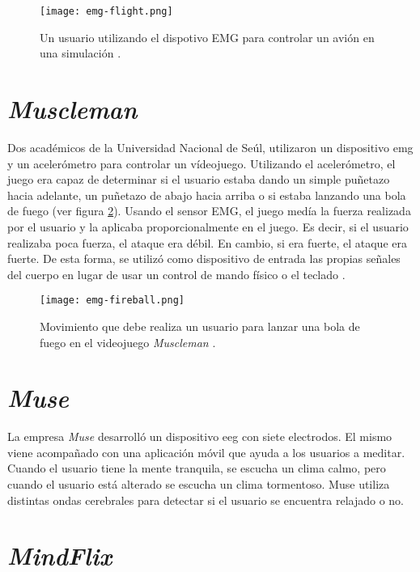 \begin{figure}[H]
	\centering
    \texttt{[image: emg-flight.png]}
    \caption{Un usuario utilizando el dispotivo EMG para controlar un avión en una simulación  \cite{emg-flight}.}
	\label{fig:emg-flight}
\end{figure}

\section{\emph{Muscleman}}

Dos académicos de la Universidad Nacional de Seúl, utilizaron un dispositivo \acrshort{emg} y un acelerómetro para controlar un vídeojuego. Utilizando el acelerómetro, el juego era capaz de determinar si el usuario estaba dando un simple puñetazo hacia adelante, un puñetazo de abajo hacia arriba o si estaba lanzando una bola de fuego (ver figura \ref{fig:fireball}). Usando el sensor EMG, el juego medía la fuerza realizada por el usuario y la aplicaba proporcionalmente en el juego. Es decir, si el usuario realizaba poca fuerza, el ataque era débil. En cambio, si era fuerte, el ataque era fuerte. De esta forma, se utilizó como dispositivo de entrada las propias señales del cuerpo en lugar de usar un control de mando físico o el teclado \cite{emg-fireball}.

\begin{figure}[H]
    \texttt{[image: emg-fireball.png]}
    \caption{Movimiento que debe realiza un usuario para lanzar una bola de fuego en el videojuego \emph{Muscleman} \cite{emg-fireball}.}
	\label{fig:fireball}
\end{figure}

\section{\emph{Muse}}

La empresa \emph{Muse} desarrolló un dispositivo \acrshort{eeg} con siete electrodos. El mismo viene acompañado con una aplicación móvil que ayuda a los usuarios a meditar. Cuando el usuario tiene la mente tranquila, se escucha un clima calmo, pero cuando el usuario está alterado se escucha un clima tormentoso. Muse utiliza distintas ondas cerebrales para detectar si el usuario se encuentra relajado o no.

\section{\emph{MindFlix}}

